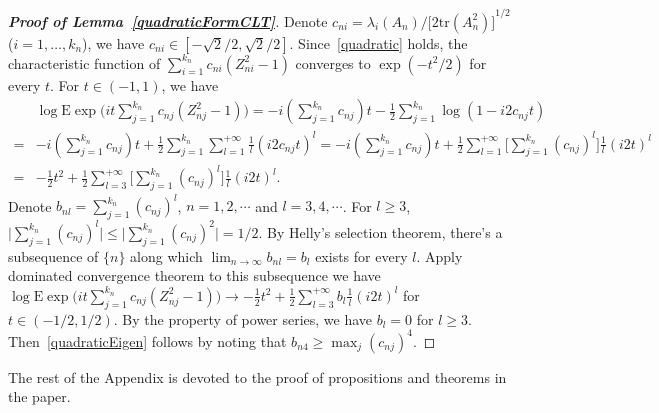 \documentclass[review]{elsarticle}
\theoremstyle{plain}
\theoremstyle{definition}
\theoremstyle{remark}
\begin{document}
\begin{proof}[\textbf{Proof of Lemma~\ref{quadraticFormCLT}}]
    Denote $c_{ni}=\lambda_i(A_n)/{\big[2\mathrm{tr}(A_n^2)\big]}^{1/2}$ ($i=1,\ldots,k_n$), we have $c_{ni}\in[-\sqrt{2}/2,\sqrt{2}/2]$.
    Since~\ref{quadratic} holds, the characteristic function of
        $
        \sum_{i=1}^{k_n}c_{ni}(Z_{ni}^2-1)
    $
    converges to $\exp(-t^2/2)$ for every $t$. For $t\in (-1,1)$, we have
    \begin{equation*}
        \begin{aligned}
            &\log \mathrm{E}\exp{\big(it \sum_{j=1}^{k_n}c_{nj}(Z_{nj}^2-1)\big)}
            =
            -i(\sum_{j=1}^{k_n}c_{nj})t-
            \frac{1}{2}\sum_{j=1}^{k_n}\log(1-i2c_{nj}t)\\
            =&
            -i(\sum_{j=1}^{k_n}c_{nj})t+
            \frac{1}{2}\sum_{j=1}^{k_n}\sum_{l=1}^{+\infty}\frac{1}{l}{(i2c_{nj}t)}^l
            =
            -i(\sum_{j=1}^{k_n}c_{nj})t+
            \frac{1}{2}\sum_{l=1}^{+\infty}\Big[\sum_{j=1}^{k_n}{(c_{nj})}^l\Big]\frac{1}{l}{(i2t)}^l\\
            =&-\frac{1}{2}t^2+
            \frac{1}{2}\sum_{l=3}^{+\infty}\Big[\sum_{j=1}^{k_n}{(c_{nj})}^l\Big]\frac{1}{l}{(i2t)}^l.
        \end{aligned}
    \end{equation*}
    Denote $b_{nl}=\sum_{j=1}^{k_n}{(c_{nj})}^l$, $n=1,2,\cdots$ and $l=3,4,\cdots$. For $l\geq 3$, $\big|\sum_{j=1}^{k_n}{(c_{nj})}^l\big|\leq \big|\sum_{j=1}^{k_n}{(c_{nj})}^2\big|=1/2$.
    By Helly's selection theorem, there's a subsequence of $\{n\}$ along which $\lim_{n\to \infty}b_{nl}=b_l$ exists for every $l$.
    Apply dominated convergence theorem to this subsequence we have
            $\log \mathrm{E}\exp{\big(it \sum_{j=1}^{k_n}c_{nj}(Z_{nj}^2-1)\big)}\to
            -\frac{1}{2}t^2+
            \frac{1}{2}\sum_{l=3}^{+\infty}b_l\frac{1}{l}{(i2t)}^l$ for $t\in(-1/2,1/2)$.
            By the property of power series, we have $b_l=0$ for $l\geq 3$. Then~\ref{quadraticEigen} follows by noting that $b_{n4}\geq \max_j{(c_{nj})}^4$.
\end{proof}




The rest of the Appendix is devoted to the proof of propositions and theorems in the paper.
\end{document}
